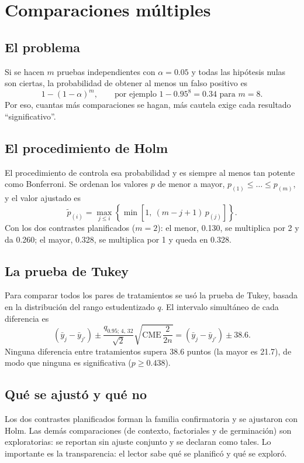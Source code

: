 \documentclass[11pt]{article}
\begin{document}
\section{Comparaciones múltiples}

\subsection{El problema}

Si se hacen $m$ pruebas independientes con $\alpha = 0.05$ y todas las hipótesis nulas son ciertas, la probabilidad de obtener al menos un falso positivo es
\[
1 - (1 - \alpha)^m, \qquad \text{por ejemplo } 1 - 0.95^8 = 0.34 \text{ para } m = 8 .
\]
Por eso, cuantas más comparaciones se hagan, más cautela exige cada resultado ``significativo''.

\subsection{El procedimiento de Holm}

El procedimiento de \citet{holm} controla esa probabilidad y es siempre al menos tan potente como Bonferroni. Se ordenan los valores $p$ de menor a mayor, $p_{(1)} \le \dots \le p_{(m)}$, y el valor ajustado es
\[
\tilde{p}_{(i)} = \max_{j \le i} \left\{ \min\!\left[1,\ (m - j + 1)\, p_{(j)}\right] \right\}.
\]
Con los dos contrastes planificados ($m = 2$): el menor, 0.130, se multiplica por 2 y da 0.260; el mayor, 0.328, se multiplica por 1 y queda en 0.328.

\subsection{La prueba de Tukey}

Para comparar todos los pares de tratamientos se usó la prueba de Tukey, basada en la distribución del rango estudentizado $q$. El intervalo simultáneo de cada diferencia es
\[
(\bar{y}_j - \bar{y}_{j'}) \pm \frac{q_{0.95;\,4,\,32}}{\sqrt{2}} \sqrt{\text{CME} \, \frac{2}{2n}} = (\bar{y}_j - \bar{y}_{j'}) \pm 38.6 .
\]
Ninguna diferencia entre tratamientos supera 38.6 puntos (la mayor es 21.7), de modo que ninguna es significativa ($p \ge 0.438$).

\subsection{Qué se ajustó y qué no}

Los dos contrastes planificados forman la familia confirmatoria y se ajustaron con Holm. Las demás comparaciones (de contexto, factoriales y de germinación) son exploratorias: se reportan sin ajuste conjunto y se declaran como tales. Lo importante es la transparencia: el lector sabe qué se planificó y qué se exploró.
\end{document}
